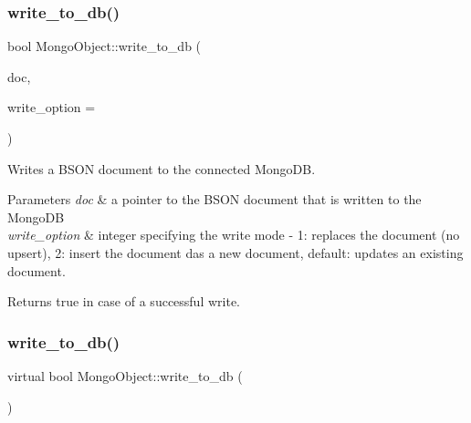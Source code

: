 \mbox{\label{class_mongo_object_ab43c880a2ae99890946e7edf3d232e5a}} 
\subsubsection{\texorpdfstring{write\+\_\+to\+\_\+db()}{write\_to\_db()}\hspace{0.1cm}{\footnotesize\ttfamily [1/2]}}
{\footnotesize\ttfamily bool Mongo\+Object\+::write\+\_\+to\+\_\+db (\begin{DoxyParamCaption}\item[{const bson\+\_\+t \&}]{doc,  }\item[{int}]{write\+\_\+option = {} }\end{DoxyParamCaption})\hspace{0.3cm}{\ttfamily [protected]}}



Writes a B\+S\+ON document to the connected Mongo\+DB. 


\begin{DoxyParams}{Parameters}
{\em doc} & a pointer to the B\+S\+ON document that is written to the Mongo\+DB \\
\hline
{\em write\+\_\+option} & integer specifying the write mode -\/ 1\+: replaces the document (no upsert), 2\+: insert the document das a new document, default\+: updates an existing document.\\
\hline
\end{DoxyParams}
\begin{DoxyReturn}{Returns}
true in case of a successful write. 
\end{DoxyReturn}
\mbox{\label{class_mongo_object_a65971bad07dce8b649820f9dee5d0ae8}} 
\subsubsection{\texorpdfstring{write\+\_\+to\+\_\+db()}{write\_to\_db()}\hspace{0.1cm}{\footnotesize\ttfamily [2/2]}}
{\footnotesize\ttfamily virtual bool Mongo\+Object\+::write\+\_\+to\+\_\+db (\begin{DoxyParamCaption}{ }\end{DoxyParamCaption})\hspace{0.3cm}{\ttfamily [virtual]}}



